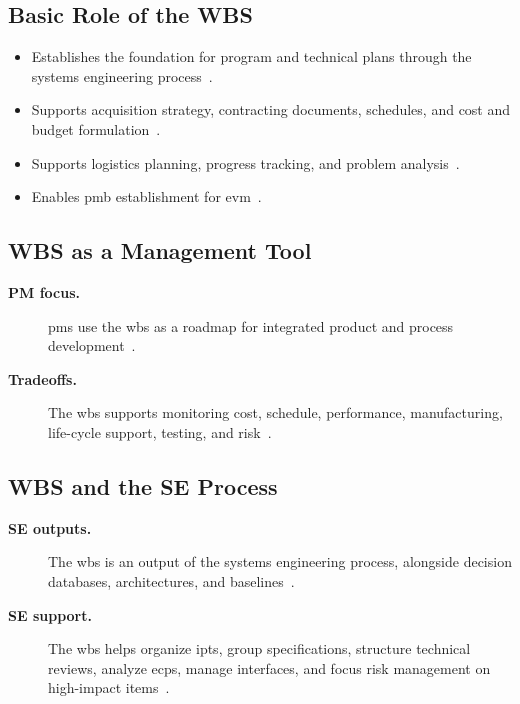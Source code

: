 \documentclass[../main.tex]{subfiles}
\begin{document}
\subsection{Basic Role of the WBS}
\begin{itemize}
  \item Establishes the foundation for program and technical plans through the systems engineering process~\autocite{edo-3-5-2-wbs-2025}.
  \item Supports acquisition strategy, contracting documents, schedules, and cost and budget formulation~\autocite{edo-3-5-2-wbs-2025}.
  \item Supports logistics planning, progress tracking, and problem analysis~\autocite{edo-3-5-2-wbs-2025}.
  \item Enables \ac{pmb} establishment for \ac{evm}~\autocite{edo-3-5-2-wbs-2025}.
\end{itemize}

\subsection{WBS as a Management Tool}
\begin{description}
  \item[\textbf{PM focus.}] \acp{pm} use the \ac{wbs} as a roadmap for integrated product and process development~\autocite{edo-3-5-2-wbs-2025}.
  \item[\textbf{Tradeoffs.}] The \ac{wbs} supports monitoring cost, schedule, performance, manufacturing, life-cycle support, testing, and risk~\autocite{edo-3-5-2-wbs-2025}.
\end{description}

\subsection{WBS and the SE Process}
\begin{description}
  \item[\textbf{SE outputs.}] The \ac{wbs} is an output of the systems engineering process, alongside decision databases, architectures, and baselines~\autocite{edo-3-5-2-wbs-2025}.
  \item[\textbf{SE support.}] The \ac{wbs} helps organize \acp{ipt}, group specifications, structure technical reviews, analyze \acp{ecp}, manage interfaces, and focus risk management on high-impact items~\autocite{edo-3-5-2-wbs-2025}.
\end{description}
\end{document}
